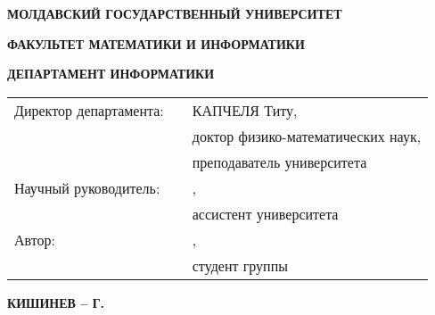 \begin{titlepage}
  \vspace*{\fill}
  \begin{center}
    \vspace*{1cm}

    \large
    \uppercase{\textbf{МОЛДАВСКИЙ ГОСУДАРСТВЕННЫЙ УНИВЕРСИТЕТ  \\}}

    \normalsize
    \uppercase{\textbf{ФАКУЛЬТЕТ МАТЕМАТИКИ И ИНФОРМАТИКИ}}
    \vspace{0.1cm}

    \normalsize
    \uppercase{\textbf{ДЕПАРТАМЕНТ ИНФОРМАТИКИ}}
    \vspace{3.0cm}

    \large
    \textbf{\correctName{\authorNameRu}}
    \vspace{1.5cm}

    \Large
    \textbf{\MakeUppercase{\thesisTitleRu}}
    \vspace{0.75cm}

    \large
    \textbf{\MakeUppercase{\identificatorulCursuluiRu}}
    \vspace{0.5cm}

    \normalsize
    \textbf{}

  \end{center}
  \vfill

  \normalsize

  \begin{flushleft}
    \newcommand{\signatureField}{\textUnderLine{4cm}{(подпись)}}

    \begin{tabular}{p{4.5cm} p{4cm} p{8cm}}
      Директор департамента: & \signatureField{} & КАПЧЕЛЯ Титу, \\
                             &                   & доктор физико-математических наук, \\
                             &                   & преподаватель университета \\
      Научный руководитель:  & \signatureField{} & \correctName{\conducatorNameRu}, \\
                             &                   & ассистент университета \\
      Автор:                 & \signatureField{} & \correctName{\authorNameRu}, \\
                             &                   & студент группы \uniGroupName{} \\
    \end{tabular}

  \end{flushleft}

  \vspace{1cm}

  \begin{center}
    \textbf{КИШИНЕВ -- \year{} Г.}
  \end{center}

\end{titlepage}

